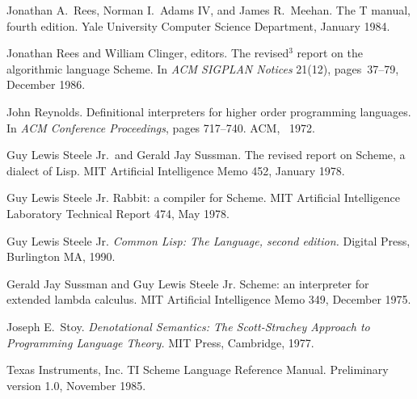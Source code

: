 \begin{thebibliography}{999}
Jonathan A.~Rees, Norman I.~Adams IV, and James R.~Meehan.
The T manual, fourth edition.
Yale University Computer Science Department, January 1984.

Jonathan Rees and William Clinger, editors.
The revised$^3$ report on the algorithmic language Scheme.
In {\em ACM SIGPLAN Notices} 21(12), pages~37--79, December 1986.

John Reynolds.
Definitional interpreters for higher order programming languages.
In {\em ACM Conference Proceedings}, pages 717--740.
ACM, ~1972.

Guy Lewis Steele Jr.~and Gerald Jay Sussman.
The revised report on Scheme, a dialect of Lisp.
MIT Artificial Intelligence Memo 452, January 1978.

Guy Lewis Steele Jr.
Rabbit: a compiler for Scheme.
MIT Artificial Intelligence Laboratory Technical Report 474, May 1978.

Guy Lewis Steele Jr.
{\em Common Lisp: The Language, second edition.}
Digital Press, Burlington MA, 1990.

Gerald Jay Sussman and Guy Lewis Steele Jr.
Scheme: an interpreter for extended lambda calculus.
MIT Artificial Intelligence Memo 349, December 1975.

Joseph E.~Stoy.
{\em Denotational Semantics: The Scott-Strachey Approach to
  Programming Language Theory.}
MIT Press, Cambridge, 1977.

Texas Instruments, Inc.
TI Scheme Language Reference Manual.
Preliminary version 1.0, November 1985. 

\end{thebibliography}
